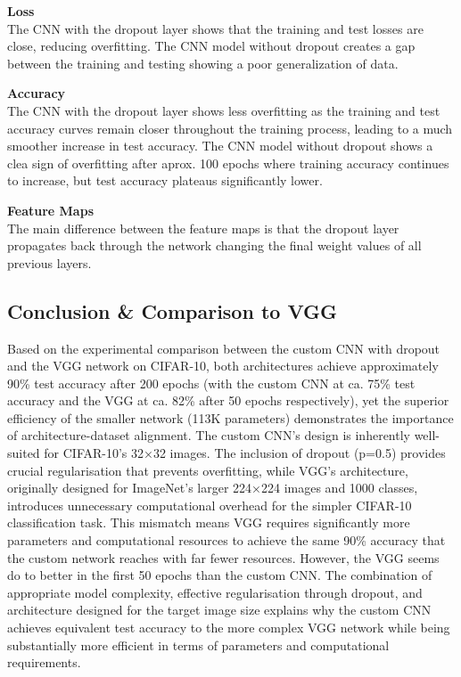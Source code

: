 \textbf{Loss}\\
The CNN with the dropout layer shows that the training and test losses are close, reducing overfitting. The CNN model without dropout creates a gap between the training and testing showing a poor generalization of data.

\textbf{Accuracy}\\
The CNN with the dropout layer shows less overfitting as the training and test accuracy curves remain closer throughout the training process, leading to a much smoother increase in test accuracy. The CNN model without dropout shows a clea sign of overfitting after aprox. 100 epochs where training accuracy continues to increase, but test accuracy plateaus significantly lower.

\textbf{Feature Maps}\\
The main difference between the feature maps is that the dropout layer propagates back through the network changing the final weight values of all previous layers.\\

\subsection*{Conclusion \& Comparison to VGG}
Based on the experimental comparison between the custom CNN with dropout and the VGG network on CIFAR-10, both architectures achieve approximately 90\% test accuracy after 200 epochs (with the custom CNN at ca. 75\% test accuracy and the VGG at ca. 82\% after 50 epochs respectively), yet the superior efficiency of the smaller network (113K parameters) demonstrates the importance of architecture-dataset alignment. The custom CNN's design is inherently well-suited for CIFAR-10's 32×32 images. The inclusion of dropout (p=0.5) provides crucial regularisation that prevents overfitting, while VGG's architecture, originally designed for ImageNet's larger 224×224 images and 1000 classes, introduces unnecessary computational overhead for the simpler CIFAR-10 classification task. This mismatch means VGG requires significantly more parameters and computational resources to achieve the same 90\% accuracy that the custom network reaches with far fewer resources. However, the VGG seems do to better in the first 50 epochs than the custom CNN. The combination of appropriate model complexity, effective regularisation through dropout, and architecture designed for the target image size explains why the custom CNN achieves equivalent test accuracy to the more complex VGG network while being substantially more efficient in terms of parameters and computational requirements.





